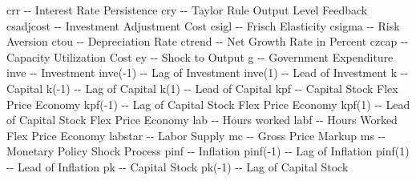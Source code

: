 \documentclass{article}%
\begin{document}
crr         {-}{-}  Interest Rate Persistence\newline%
cry         {-}{-}  Taylor Rule Output Level Feedback\newline%
csadjcost   {-}{-}  Investment Adjustment Cost\newline%
csigl       {-}{-}  Frisch Elasticity\newline%
csigma      {-}{-}  Risk Aversion\newline%
ctou        {-}{-}  Depreciation Rate\newline%
ctrend      {-}{-}  Net Growth Rate in Percent\newline%
czcap       {-}{-}  Capacity Utilization Cost\newline%
ey          {-}{-}  Shock to Output\newline%
g           {-}{-}  Government Expenditure\newline%
inve        {-}{-}  Investment\newline%
inve({-}1)    {-}{-}  Lag of Investment\newline%
inve(1)     {-}{-}  Lead of Investment\newline%
k           {-}{-}  Capital\newline%
k({-}1)       {-}{-}  Lag of Capital\newline%
k(1)        {-}{-}  Lead of Capital\newline%
kpf         {-}{-}  Capital Stock Flex Price Economy\newline%
kpf({-}1)     {-}{-}  Lag of Capital Stock Flex Price Economy\newline%
kpf(1)      {-}{-}  Lead of Capital Stock Flex Price Economy\newline%
lab         {-}{-}  Hours worked\newline%
labf        {-}{-}  Hours Worked Flex Price Economy\newline%
labstar     {-}{-}  Labor Supply\newline%
mc          {-}{-}  Gross Price Markup\newline%
ms          {-}{-}  Monetary Policy Shock Process\newline%
pinf        {-}{-}  Inflation\newline%
pinf({-}1)    {-}{-}  Lag of Inflation\newline%
pinf(1)     {-}{-}  Lead of Inflation\newline%
pk          {-}{-}  Capital Stock\newline%
pk({-}1)      {-}{-}  Lag of Capital Stock\newline%
\end{document}
